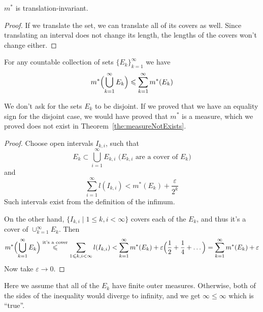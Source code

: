 \begin{lemma}
    $m^*$ is translation-invariant.
\end{lemma}
\begin{proof}
    If we translate the set, we can translate all of its 
    covers as well. Since translating an interval does not
    change its length, the lengths of the covers won't change either.
\end{proof}

\begin{proposition}
    \label{the:countableSubadditivity}
    For any countable collection of sets
    $\{E_k\}_{k=1}^\infty$ we have 
    \[ m^*\Bigl(\bigcup_{k=1}^\infty E_k\Bigr) \le \sum_{k=1}^\infty m^*(E_k) \]
\end{proposition}
\begin{remark}
    We don't ask for the sets $E_k$ to be disjoint. 
    If we proved that we have an equality sign for the disjoint case,
    we would have proved that $m^*$ is a measure, which we proved does not exist
    in Theorem~\ref{the:measureNotExists}.
\end{remark}
\begin{proof}
    Choose open intervals $I_{k,i}$, such that
    \[E_k \subset \bigcup_{i=1}^\infty E_{k,i} \text{ ($E_{k, i}$ are a cover of $E_k$)}\] and
    \[\sum_{i=1}^\infty l(I_{k,i}) < m^*(E_k) + \frac{\varepsilon}{2^k}\]
    Such intervals exist from the definition of the infimum.

    On the other hand, $\{ I_{k,i} \mid 1 \le k, i < \infty \}$
    covers each of the $E_k$, and thus it's a cover of
    $\cup_{k=1}^\infty E_k$.
    Then 
    \[ 
        m^*\Bigl(\bigcup_{k=1}^\infty E_k\Bigr) \overset{\text{it's a cover}}{\le}
        \sum_{1 \le k, i < \infty} l(I_{k,i}) <
        \sum_{k=1}^\infty m^*(E_k) + \varepsilon \Bigl(\frac{1}{2} + \frac{1}{4} + \dots\Bigr) =
        \sum_{k=1}^\infty m^*(E_k) + \varepsilon
    \]
    Now take $\varepsilon \to 0$.
\end{proof}
\begin{remark}
    Here we assume that all of the $E_k$ have finite outer measures.
    Otherwise, both of the sides of the inequality would diverge
    to infinity, and we get $\infty \le \infty$ which is ``true''.
\end{remark}

\pagebreak
